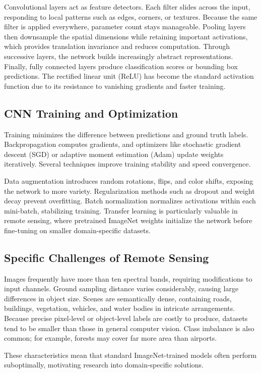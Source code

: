 \documentclass[12pt,a4paper]{article}
\begin{document}
Convolutional layers act as feature detectors. Each filter slides across the input, responding to local patterns such as edges, corners, or textures. Because the same filter is applied everywhere, parameter count stays manageable. Pooling layers then downsample the spatial dimensions while retaining important activations, which provides translation invariance and reduces computation. Through successive layers, the network builds increasingly abstract representations. Finally, fully connected layers produce classification scores or bounding box predictions. The rectified linear unit (ReLU) has become the standard activation function due to its resistance to vanishing gradients and faster training.

\subsection{CNN Training and Optimization}
Training minimizes the difference between predictions and ground truth labels. Backpropagation computes gradients, and optimizers like stochastic gradient descent (SGD) or adaptive moment estimation (Adam) update weights iteratively. Several techniques improve training stability and speed convergence.

Data augmentation introduces random rotations, flips, and color shifts, exposing the network to more variety. Regularization methods such as dropout and weight decay prevent overfitting. Batch normalization normalizes activations within each mini-batch, stabilizing training. Transfer learning is particularly valuable in remote sensing, where pretrained ImageNet weights initialize the network before fine-tuning on smaller domain-specific datasets.

\subsection{Specific Challenges of Remote Sensing}
Images frequently have more than ten spectral bands, requiring modifications to input channels. Ground sampling distance varies considerably, causing large differences in object size. Scenes are semantically dense, containing roads, buildings, vegetation, vehicles, and water bodies in intricate arrangements. Because precise pixel-level or object-level labels are costly to produce, datasets tend to be smaller than those in general computer vision. Class imbalance is also common; for example, forests may cover far more area than airports.

These characteristics mean that standard ImageNet-trained models often perform suboptimally, motivating research into domain-specific solutions.
\end{document}

